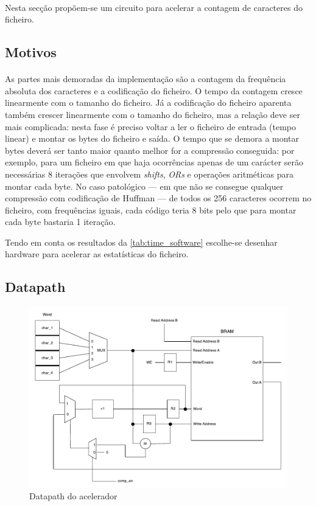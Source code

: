 \paragraph{} Nesta secção propõem-se um circuito para acelerar a contagem de caracteres do ficheiro.

\subsection{Motivos}
  \paragraph{} As partes mais demoradas da implementação são a contagem da frequência absoluta dos caracteres e a codificação do ficheiro. O tempo da contagem cresce linearmente com o tamanho do ficheiro. Já a codificação do ficheiro aparenta também crescer linearmente com o tamanho do ficheiro, mas a relação deve ser mais complicada: nesta fase é preciso voltar a ler o ficheiro de entrada (tempo linear) e montar os bytes do ficheiro e saída. O tempo que se demora a montar bytes deverá ser tanto maior quanto melhor for a compressão conseguida: por exemplo, para um ficheiro em que haja ocorrências apenas de um carácter serão necessárias 8 iterações que envolvem \textit{shifts}, \textit{ORs} e operações aritméticas para montar cada byte. No caso patológico --- em que não se consegue qualquer compressão com codificação de Huffman --- de todos os 256 caracteres ocorrem no ficheiro, com frequências iguais, cada código teria 8 bits pelo que para montar cada byte bastaria 1 iteração.

  Tendo em conta os resultados da \autoref{tab:time_software} escolhe-se desenhar hardware para acelerar as estatísticas do ficheiro.

  \subsection{Datapath}

  \begin{figure}[H]
    \centering
    \includegraphics[width=1.0\textwidth]{img/hw_datapath}
    \caption{Datapath do acelerador}
    \label{fig:hw_datapath}
  \end{figure}


